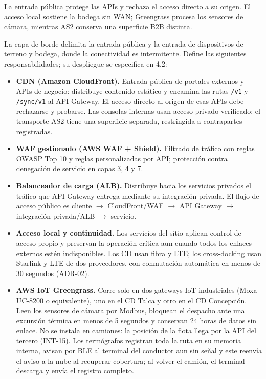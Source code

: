 La entrada pública protege las APIs y rechaza el acceso directo a su origen. El acceso local sostiene la bodega sin WAN; Greengrass procesa los sensores de cámara, mientras AS2 conserva una superficie B2B distinta.


La capa de borde delimita la entrada pública y la entrada de dispositivos de terreno y bodega, donde la conectividad es intermitente. Define las siguientes responsabilidades; su despliegue se especifica en 4.2:

\begin{itemize}
  \item \textbf{CDN (Amazon CloudFront).} Entrada pública de portales externos y APIs de negocio: distribuye contenido estático y encamina las rutas \texttt{/v1} y \texttt{/sync/v1} al API Gateway. El acceso directo al origen de esas APIs debe rechazarse y probarse. Las consolas internas usan acceso privado verificado; el transporte AS2 tiene una superficie separada, restringida a contrapartes registradas.
  \item \textbf{WAF gestionado (AWS WAF + Shield).} Filtrado de tráfico con reglas OWASP Top 10 y reglas personalizadas por API; protección contra denegación de servicio en capas 3, 4 y 7.
  \item \textbf{Balanceador de carga (ALB).} Distribuye hacia los servicios privados el tráfico que API Gateway entrega mediante su integración privada. El flujo de acceso público es cliente $\rightarrow$ CloudFront/WAF $\rightarrow$ API Gateway $\rightarrow$ integración privada/ALB $\rightarrow$ servicio.
  \item \textbf{Acceso local y continuidad.} Los servicios del sitio aplican control de acceso propio y preservan la operación crítica aun cuando todos los enlaces externos estén indisponibles. Los CD usan fibra y LTE; los cross-docking usan Starlink y LTE de dos proveedores, con conmutación automática en menos de 30 segundos (ADR-02).
  \item \textbf{AWS IoT Greengrass.} Corre solo en dos gateways IoT industriales (Moxa UC-8200 o equivalente), uno en el CD Talca y otro en el CD Concepción. Leen los sensores de cámara por Modbus, bloquean el despacho ante una excursión térmica en menos de 5 segundos y conservan 24 horas de datos sin enlace. No se instala en camiones: la posición de la flota llega por la API del tercero (INT-15). Los termógrafos registran toda la ruta en su memoria interna, avisan por BLE al terminal del conductor aun sin señal y este reenvía el aviso a la nube al recuperar cobertura; al volver el camión, el terminal descarga y envía el registro completo.
\end{itemize}

